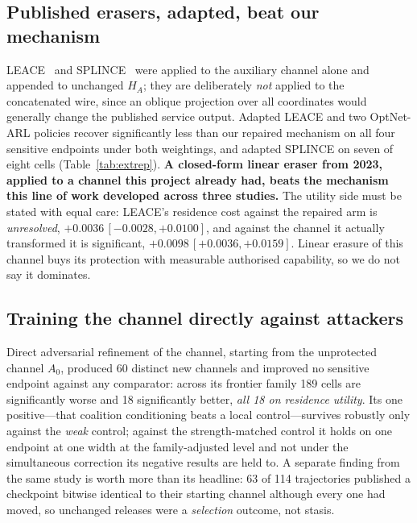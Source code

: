 \documentclass[conference]{IEEEtran}
\begin{document}
\subsection{Published erasers, adapted, beat our mechanism}
\label{sec:external}
LEACE~\cite{belrose2023leace} and SPLINCE~\cite{holstege2025splince} were applied to the auxiliary
channel alone and appended to unchanged $H_A$; they are deliberately \emph{not} applied to the
concatenated wire, since an oblique projection over all coordinates would generally change the published
service output. Adapted LEACE and two OptNet-ARL policies recover significantly less than our repaired
mechanism on all four sensitive endpoints under both weightings, and adapted SPLINCE on seven of eight
cells (Table~\ref{tab:extrep}). \textbf{A closed-form linear eraser from 2023, applied to a channel this
project already had, beats the mechanism this line of work developed across three studies.} The utility
side must be stated with equal care: LEACE's residence cost against the repaired arm is
\emph{unresolved}, $+0.0036\,[-0.0028,+0.0100]$, and against the channel it actually transformed it is
significant, $+0.0098\,[+0.0036,+0.0159]$. Linear erasure of this channel buys its protection with
measurable authorised capability, so we do not say it dominates.

\begin{table}[t]
\centering\footnotesize

\caption{Adapted published methods against the repaired mechanism at rank 16 with the coalition policy.
Every arm transforms only the auxiliary channel and appends it to unchanged $H_A$. Development pools.
\noteExternalVsRepaired}
\label{tab:extrep}
\end{table}

\subsection{Training the channel directly against attackers}
Direct adversarial refinement of the channel, starting from the unprotected channel $A_0$, produced 60
distinct new channels and improved no sensitive endpoint against any comparator: across its frontier
family 189 cells are significantly worse and 18 significantly better, \emph{all 18 on residence utility}.
Its one positive---that coalition conditioning beats a local control---survives robustly only against the
\emph{weak} control; against the strength-matched control it holds on one endpoint at one width at the
family-adjusted level and not under the simultaneous correction its negative results are held to. A
separate finding from the same study is worth more than its headline: 63 of 114 trajectories published a
checkpoint bitwise identical to their starting channel although every one had moved, so unchanged
releases were a \emph{selection} outcome, not stasis.
\end{document}
